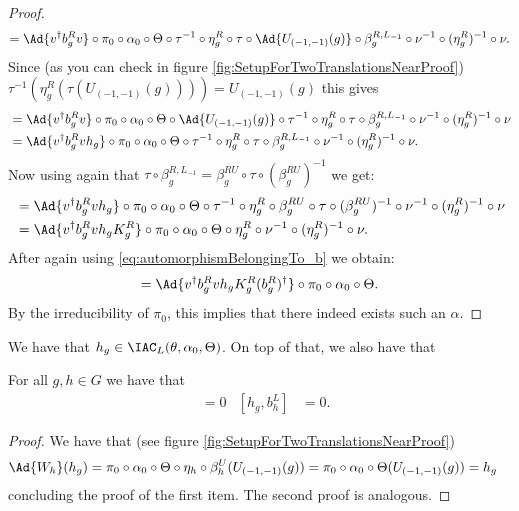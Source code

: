 \begin{proof}
	\begin{equation}
		=\Ad{v^\dagger b_g^R v}\circ\pi_0\circ\alpha_0\circ\Theta\circ\tau^{-1}\circ\eta_g^R\circ\tau\circ\Ad{U_{(-1,-1)}(g)}\circ\beta_g^{R,L_{-1}}\circ\nu^{-1}\circ(\eta_g^R)^{-1}\circ\nu.
	\end{equation}
	Since (as you can check in figure \ref{fig:SetupForTwoTranslationsNearProof}) $\tau^{-1}(\eta_g^R(\tau(U_{(-1,-1)}(g))))=U_{(-1,-1)}(g)$ this gives
	\begin{align}
		&=\Ad{v^\dagger b_g^R v}\circ\pi_0\circ\alpha_0\circ\Theta\circ\Ad{U_{(-1,-1)}(g)}\circ\tau^{-1}\circ\eta_g^R\circ\tau\circ\beta_g^{R,L_{-1}}\circ\nu^{-1}\circ(\eta_g^R)^{-1}\circ\nu\\
		\nonumber
		&=\Ad{v^\dagger b_g^R vh_g}\circ\pi_0\circ\alpha_0\circ\Theta\circ\tau^{-1}\circ\eta_g^R\circ\tau\circ\beta_g^{R,L_{-1}}\circ\nu^{-1}\circ(\eta_g^R)^{-1}\circ\nu.
	\end{align}
	Now using again that $\tau\circ\beta_g^{R,L_{-1}}=\beta_{g}^{RU}\circ\tau\circ(\beta_g^{RU})^{-1}$ we get:
	\begin{align}
		&=\Ad{v^\dagger b_g^R vh_g}\circ\pi_0\circ\alpha_0\circ\Theta\circ\tau^{-1}\circ\eta_g^R\circ\beta_{g}^{RU}\circ\tau\circ(\beta_g^{RU})^{-1}\circ\nu^{-1}\circ(\eta_g^R)^{-1}\circ\nu\\
		\nonumber
		&=\Ad{v^\dagger b_g^R vh_gK_g^R}\circ\pi_0\circ\alpha_0\circ\Theta\circ\eta_g^R\circ\nu^{-1}\circ(\eta_g^R)^{-1}\circ\nu.
	\end{align}
	After again using \eqref{eq:automorphismBelongingTo_b} we obtain:
	\begin{align}
		=\Ad{v^\dagger b_g^R vh_gK_g^R(b_g^R)^\dagger}\circ\pi_0\circ\alpha_0\circ\Theta.
	\end{align}
	By the irreducibility of $\pi_0$, this implies that there indeed exists such an $\alpha$.
\end{proof}
We have that $h_g\in\IAC_L(\theta,\alpha_0,\Theta)$. On top of that, we also have that
\begin{lemma}\label{lem:W_g_And_h_g_Commute}
	For all $g,h\in G$ we have that
	\begin{align}
		[h_g,W_h]&=0&[h_g,b_h^L]&=0.
	\end{align}
\end{lemma}
\begin{proof}
	We have that (see figure \ref{fig:SetupForTwoTranslationsNearProof})
	\begin{align}
		\Ad{W_h}(h_g)&=\pi_0\circ\alpha_0\circ\Theta\circ\eta_h\circ\beta_h^U(U_{(-1,-1)}(g))=\pi_0\circ\alpha_0\circ\Theta(U_{(-1,-1)}(g))=h_g
	\end{align}
	concluding the proof of the first item. The second proof is analogous.
\end{proof}
